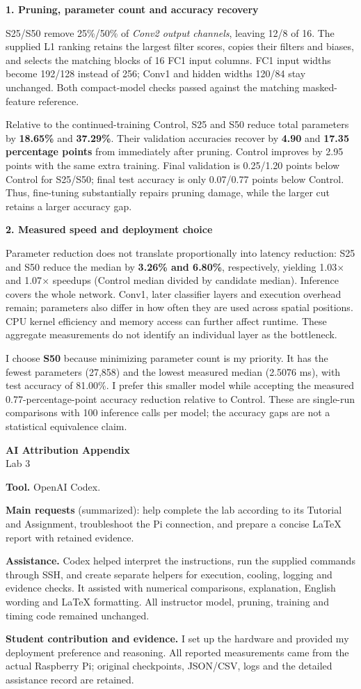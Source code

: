 \documentclass[11pt,letterpaper]{article}
\newcommand{\topic}[1]{\par\smallskip\textbf{#1}\par\nopagebreak}
\begin{document}
\topic{1. Pruning, parameter count and accuracy recovery}
S25/S50 remove 25\%/50\% of \emph{Conv2 output channels}, leaving 12/8 of 16. The supplied L1 ranking retains the largest filter scores, copies their filters and biases, and selects the matching blocks of 16 FC1 input columns. FC1 input widths become 192/128 instead of 256; Conv1 and hidden widths 120/84 stay unchanged. Both compact-model checks passed against the matching masked-feature reference.

Relative to the continued-training Control, S25 and S50 reduce total parameters by \textbf{18.65\%} and \textbf{37.29\%}. Their validation accuracies recover by \textbf{4.90} and \textbf{17.35 percentage points} from immediately after pruning. Control improves by 2.95 points with the same extra training. Final validation is 0.25/1.20 points below Control for S25/S50; final test accuracy is only 0.07/0.77 points below Control. Thus, fine-tuning substantially repairs pruning damage, while the larger cut retains a larger accuracy gap.

\topic{2. Measured speed and deployment choice}
Parameter reduction does not translate proportionally into latency reduction: S25 and S50 reduce the median by \textbf{3.26\% and 6.80\%}, respectively, yielding 1.03$\times$ and 1.07$\times$ speedups (Control median divided by candidate median). Inference covers the whole network. Conv1, later classifier layers and execution overhead remain; parameters also differ in how often they are used across spatial positions. CPU kernel efficiency and memory access can further affect runtime. These aggregate measurements do not identify an individual layer as the bottleneck.

I choose \textbf{S50} because minimizing parameter count is my priority. It has the fewest parameters (27,858) and the lowest measured median (2.5076 ms), with test accuracy of 81.00\%. I prefer this smaller model while accepting the measured 0.77-percentage-point accuracy reduction relative to Control. These are single-run comparisons with 100 inference calls per model; the accuracy gaps are not a statistical equivalence claim.

\newpage
\begin{center}
{\Large\bfseries AI Attribution Appendix}\\[4pt]
Lab 3
\end{center}
\textbf{Tool.} OpenAI Codex.

\textbf{Main requests} (summarized): help complete the lab according to its Tutorial and Assignment, troubleshoot the Pi connection, and prepare a concise LaTeX report with retained evidence.

\textbf{Assistance.} Codex helped interpret the instructions, run the supplied commands through SSH, and create separate helpers for execution, cooling, logging and evidence checks. It assisted with numerical comparisons, explanation, English wording and LaTeX formatting. All instructor model, pruning, training and timing code remained unchanged.

\textbf{Student contribution and evidence.} I set up the hardware and provided my deployment preference and reasoning. All reported measurements came from the actual Raspberry Pi; original checkpoints, JSON/CSV, logs and the detailed assistance record are retained.
\end{document}
